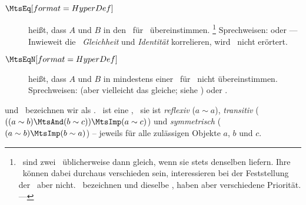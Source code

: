 \begin{description}
	\item[$\defSym{\MtsEq}$]  \label{def:Gleichheit}
	 heißt, dass $A$ und $B$ in den \interessierendenEigenschaften\ für \MtsEq\ übereinstimmen.%
	\footnote{%
		\textZB\ sind zwei \Junktoren\ üblicherweise dann gleich, wenn sie stets denselben \emph{\Wahrheitswert} liefern.
		Ihre \Bezeichnungen\ können dabei durchaus verschieden sein, interessieren bei der Feststellung der \Gleichheit\ aber nicht.
		\textZB\ bezeichnen \chrqt{\MtsAnd} und \chrqt{\MtsUnd} dieselbe \Operation, haben aber verschiedene Priorität. --- 
	}
	Sprechweisen:  oder 
	--- Inwieweit die \Begriffe\ \emph{Gleichheit} und \emph{Identität} korrelieren, wird \hier\ nicht erörtert.
	\item[$\defSym{\MtsEqN}$]  \label{def:Ungleichheit}
	 heißt, dass $A$ und $B$ in mindestens einer \interessierendenEigenschaft\ für \MtsEq\ nicht übereinstimmen.
	Sprechweisen:  (aber vielleicht das gleiche; siehe \MtsEquiv) oder .
\end{description}

\MtsEq und \MtsEqN\ bezeichnen wir als  .
\Gleichheit\ ist eine , \textdh\ sie ist \emph{reflexiv} ($a \sim a$), \emph{transitiv} ($((a \sim b) \MtsAnd (b \sim c)) \MtsImp (a \sim c)$) und \emph{symmetrisch} ($(a \sim b) \MtsImp (b \sim a)$)
-- jeweils für alle zulässigen Objekte $a$, $b$ und $c$.

